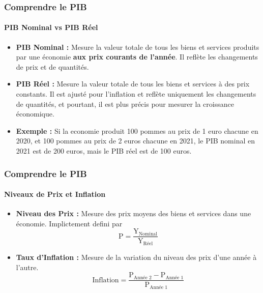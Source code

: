 \documentclass{beamer}
\begin{document}
\begin{frame}
    \frametitle{Comprendre le PIB}
    \framesubtitle{PIB Nominal vs PIB Réel}
        \begin{itemize}
            \item \textbf{PIB Nominal :} 
            Mesure la valeur totale de tous les biens et services produits par une 
            économie \textbf{aux prix courants de l'année}. 
            Il reflète les changements de prix et de quantités.
            \pause
            \item \textbf{PIB Réel :} 
            Mesure la valeur totale de tous les biens et services à des prix constants. 
            Il est ajusté pour l'inflation et reflète uniquement les changements de 
            quantités, et pourtant, il est plus précis pour mesurer la croissance économique.
            \pause
            \item \textbf{Exemple :} 
            Si la economie produit 100 pommes au prix de 1 euro chacune en 2020,
            et 100 pommes au prix de 2 euros chacune en 2021, le PIB nominal en 2021 est de 200 euros,
            mais le PIB réel est de 100 euros.
        \end{itemize}
\end{frame}

\begin{frame}
    \frametitle{Comprendre le PIB}
    \framesubtitle{Niveaux de Prix et Inflation}
    \begin{itemize}
        \item \textbf{Niveau des Prix :} 
        Mesure des prix moyens des biens et services dans une économie. 
        Implictement defini par 
        \begin{equation}
            \text{P} = \frac{\text{Y}_{\text{Nominal}}}{\text{Y}_{\text{Réel}}}
        \end{equation}
        \item \textbf{Taux d'Inflation :}
        Mesure de la variation du niveau des prix d'une année à l'autre.
        \begin{equation}
            \text{Inflation} = \frac{\text{P}_{\text{Année 2}} - \text{P}_{\text{Année 1}}}{\text{P}_{\text{Année 1}}}
        \end{equation}
    \end{itemize}
\end{frame}
    
\end{document}
